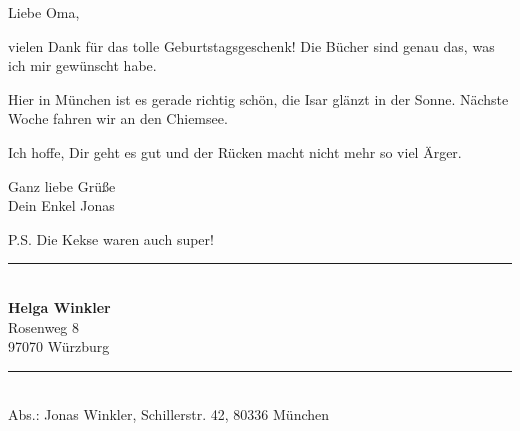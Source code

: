 \documentclass{article}
\begin{document}
\begin{minipage}[t]{0.45\textwidth}
\vspace{0pt}
{\small
Liebe Oma,

vielen Dank f\"ur das tolle Geburtstagsgeschenk! Die B\"ucher sind genau das, was ich mir gew\"unscht habe.

Hier in M\"unchen ist es gerade richtig sch\"on, die Isar gl\"anzt in der Sonne. N\"achste Woche fahren wir an den Chiemsee.

Ich hoffe, Dir geht es gut und der R\"ucken macht nicht mehr so viel \"Arger.

Ganz liebe Gr\"u\ss e\\
Dein Enkel Jonas

\vspace{0.3cm}
{\footnotesize P.S. Die Kekse waren auch super!}
}
\end{minipage}%
\hfill
\begin{minipage}[t]{0.45\textwidth}
\vspace{0pt}
\rule{\textwidth}{0.4pt}\\[0.5cm]

\textbf{\large Helga Winkler}\\
Rosenweg 8\\
97070 W\"urzburg\\[1.5cm]

\rule{\textwidth}{0.4pt}\\[0.2cm]
{\footnotesize Abs.: Jonas Winkler, Schillerstr. 42, 80336 M\"unchen}
\end{minipage}
\end{document}
